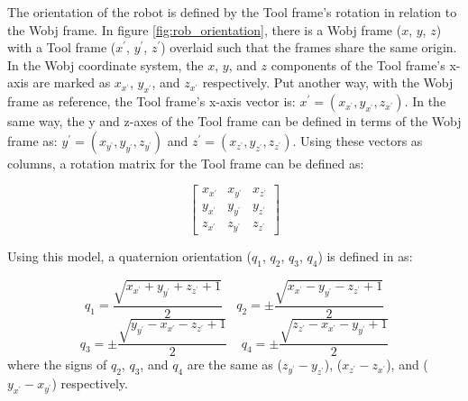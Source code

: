 \documentclass{cslthse-msc}
\begin{document}
The orientation of the robot is defined by the Tool frame's rotation in relation to the Wobj frame. In figure \ref{fig:rob_orientation}, there is a Wobj frame ($x$, $y$, $z$) with a Tool frame ($x^\prime$, $y^\prime$, $z^\prime$) overlaid such that the frames share the same origin. In the Wobj coordinate system, the $x$, $y$, and $z$ components of the Tool frame's x-axis are marked as $x_{x^\prime}$, $y_{x^\prime}$, and $z_{x^\prime}$ respectively. Put another way, with the Wobj frame as reference, the Tool frame's x-axis vector is: $x^\prime = (x_{x^\prime}, y_{x^\prime}, z_{x^\prime})$. In the same way, the y and z-axes of the Tool frame can be defined in terms of the Wobj frame as: $y^\prime = (x_{y^\prime}, y_{y^\prime}, z_{y^\prime})$ and $z^\prime = (x_{z^\prime}, y_{z^\prime}, z_{z^\prime})$. Using these vectors as columns, a rotation matrix for the Tool frame can be defined as: 

$$
\begin{bmatrix}
x_{x^\prime} & x_{y^\prime} & x_{z^\prime}\\
y_{x^\prime} & y_{y^\prime} & y_{z^\prime}\\
z_{x^\prime} & z_{y^\prime} & z_{z^\prime}
\end{bmatrix}
$$


Using this model, a quaternion orientation ($q_1$, $q_2$, $q_3$, $q_4$) is defined in \cite[Sec. 3.53]{ABB:rapid_instructions} as: 

$$q_1 = \frac{\sqrt{x_{x^\prime} + y_{y^\prime} + z_{z^\prime} + 1}}{2} \; \; \; \; q_2 = \pm \frac{\sqrt{x_{x^\prime} - y_{y^\prime} - z_{z^\prime} + 1}}{2}$$
$$q_3 = \pm \frac{\sqrt{y_{y^\prime} - x_{x^\prime} - z_{z^\prime} + 1}}{2} \; \; \; \; q_4 = \pm \frac{\sqrt{z_{z^\prime} - x_{x^\prime} - y_{y^\prime} + 1}}{2}$$
where the signs of $q_2$, $q_3$, and $q_4$ are the same as ($z_{y^\prime} - y_{z^\prime}$), ($x_{z^\prime} - z_{x^\prime}$), and ($y_{x^\prime} - x_{y^\prime}$) respectively. 
\end{document}
